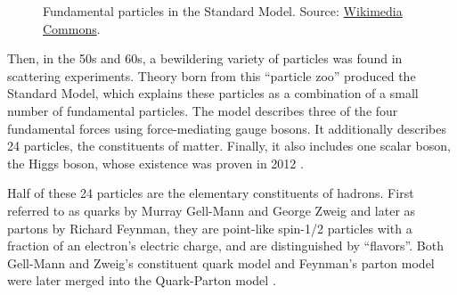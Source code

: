     \begin{figure}[b!]
        \centering{}
        \caption[The standard model.]{Fundamental particles in the Standard Model. 
        Source: \hyperlink{https://commons.wikimedia.org/wiki/Main_Page}{Wikimedia Commons}.}
        \label{fig::parts_std_model}
    \end{figure}

    Then, in the 50s and 60s, a bewildering variety of particles was found in scattering experiments.
    Theory born from this ``particle zoo'' produced the Standard Model, which explains these particles as a combination of a small number of fundamental particles.
    The model describes three of the four fundamental forces using force-mediating gauge bosons.
    It additionally describes 24 particles, the constituents of matter.
    Finally, it also includes one scalar boson, the Higgs boson, whose existence was proven in 2012 \cite{aad2012}.

    Half of these 24 particles are the elementary constituents of hadrons.
    First referred to as quarks by Murray Gell-Mann and George Zweig and later as partons by Richard Feynman, they are point-like spin-1/2 particles with a fraction of an electron's electric charge, and are distinguished by ``flavors''.
    Both Gell-Mann and Zweig's constituent quark model and Feynman's parton model were later merged into the Quark-Parton model \cite{perkins2000}.

